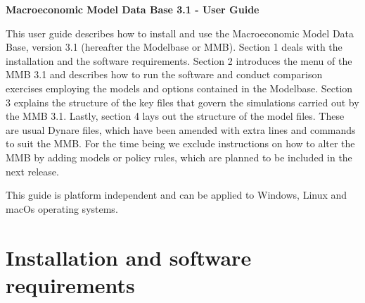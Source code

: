 \documentclass[11pt,a4paper]{article}
\begin{document}


\begin{center}
{\Large \textbf{Macroeconomic Model Data Base 3.1 - User Guide } }
\par\end{center}


\vspace{1.5cm}


This user guide describes how to install and use the Macroeconomic Model Data Base, version 3.1 (hereafter the Modelbase or MMB). Section 1 deals with the installation and the software requirements.
Section 2 introduces the menu of the MMB 3.1 and describes how to run the software and conduct comparison exercises employing the models and options contained in the Modelbase.
Section 3 explains the structure of the key files that govern the simulations carried out by the MMB 3.1. Lastly, section 4 lays out the structure of the model files. These are usual Dynare files, which have been amended with extra lines and commands to suit the MMB.
For the time being we exclude instructions on how to alter the MMB by adding models or policy rules, which are planned to be included in the next release.

This guide is platform independent and can be applied to Windows, Linux and macOs operating systems.


%
%
%
\section{Installation and software requirements}\label{sec:installation}
\vspace{0.5cm}

\end{document}
